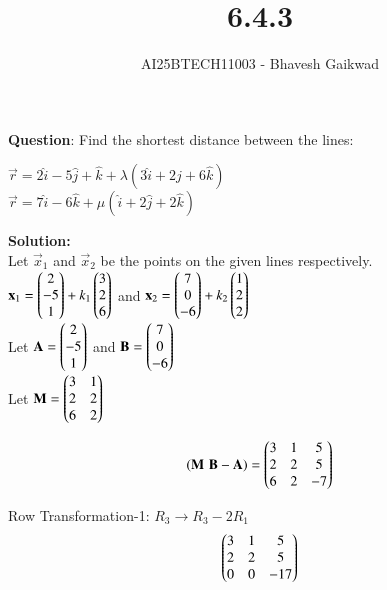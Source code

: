 \documentclass[journal]{IEEEtran}
\begin{document}

\vspace{3cm}

\title{6.4.3}
\author{AI25BTECH11003 - Bhavesh Gaikwad}
{\let\newpage\relax\maketitle}

\renewcommand{\thefigure}{\theenumi}
\renewcommand{\thetable}{\theenumi}
\setlength{\intextsep}{10pt} 


\renewcommand{\thetable}{\theenumi}


\textbf{Question}: Find the shortest distance between the lines:\\
\begin{center}
$\vec{r} = 2\hat{i} - 5\hat{j} +\hat{k} + \lambda(3\hat{i} + 2\hat{j} + 6\hat{k})$\\
$\vec{r} = 7\hat{i} - 6\hat{k} + \mu(\hat{i} + 2\hat{j} + 2\hat{k})$
\end{center}


\textbf{Solution:}\\
Let $\vec{x}_1$ and $\vec{x}_2$ be the points on the given lines respectively.\\
$\mathbf{x}_1 = \begin{pmatrix}2 \\ -5 \\ 1\end{pmatrix} + k_1\begin{pmatrix}3 \\ 2 \\6\end{pmatrix}$ and $\mathbf{x}_2 = \begin{pmatrix}7 \\ 0 \\ -6\end{pmatrix} + k_2\begin{pmatrix}1 \\ 2 \\2\end{pmatrix}$\\
Let $\mathbf{A} = \begin{pmatrix}2 \\ -5 \\ 1\end{pmatrix}$ and $\mathbf{B} = \begin{pmatrix}7 \\ 0 \\ -6\end{pmatrix}$\\
Let $\mathbf{M} = \begin{pmatrix}3 & 1 \\ 2 & 2 \\ 6 & 2\end{pmatrix}$


\begin{equation}
    (\mathbf{M} \, \, \mathbf{B}-\mathbf{A}) = \begin{pmatrix}3 & 1 & 5 \\ 2 & 2 & 5 \\ 6 & 2 & -7\end{pmatrix}
\end{equation}

Row Transformation-1: $R_3 \rightarrow R_3 - 2R_1$
\begin{equation}
\begin{pmatrix}3 & 1 & 5 \\ 2 & 2 & 5 \\ 0 & 0 & -17\end{pmatrix}
\end{equation}
\end{document}
